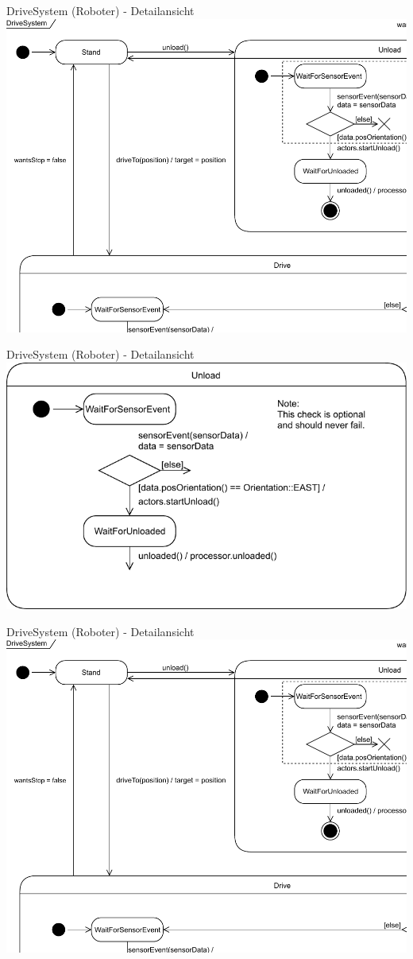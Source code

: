 \documentclass{beamer}
\begin{document}
\begin{frame}{DriveSystem (Roboter) - Detailansicht}
\centering
\includegraphics[height=0.75\textheight]{PDF/DriveSystem1.pdf}
\end{frame}
\begin{frame}{DriveSystem (Roboter) - Detailansicht}
\centering
\includegraphics[height=0.75\textheight]{PDF/DriveSystem2.pdf}
\end{frame}
\begin{frame}{DriveSystem (Roboter) - Detailansicht}
\centering
\includegraphics[height=0.75\textheight]{PDF/DriveSystem1.pdf}
\end{frame}
\end{document}
